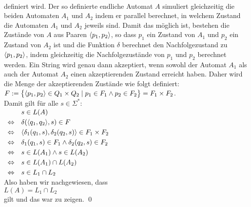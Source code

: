 \\[0.2cm]
definiert wird.  Der so definierte endliche Automat $A$ simuliert gleichzeitig die 
beiden Automaten $A_1$ und $A_2$ indem er parallel berechnet, in
welchem Zustand die Automaten $A_1$ und $A_2$ jeweils sind.  Damit das m\"oglich ist, bestehen die Zust\"ande
von $A$ aus Paaren $\pair(p_1,p_2)$, so dass $p_1$ ein Zustand von $A_1$ und $p_2$ ein
Zustand von $A_2$ ist und die Funktion $\delta$ berechnet den Nachfolgezustand zu
$\pair(p_1,p_2)$, indem gleichzeitig die Nachfolgezust\"ande von $p_1$ und $p_2$ berechnet werden.
Ein String wird genau dann akzeptiert, wenn sowohl der Automat $A_1$ als auch der Automat $A_2$ einen
akzeptierenden Zustand erreicht haben.  Daher wird die Menge der akzeptierenden Zust\"ande 
wie folgt definiert:
\\[0.2cm]
\hspace*{1.3cm}
$F := \bigl\{ \pair(p_1,p_2) \in Q_1 \times Q_2 \mid p_1 \in F_1 \wedge p_2 \in F_2 \bigr\} = F_1 \times F_2$.
\\[0.2cm]
Damit gilt f\"ur alle $s \in \Sigma^*$:
\\[0.2cm]
\hspace*{1.3cm}
$
\begin{array}[t]{cl}
                & s \in L(A)                                                           \\[0.1cm]
\Leftrightarrow & \delta(\pair(q_1,q_2), s) \in F                                      \\[0.1cm]
\Leftrightarrow & \langle \delta_1(q_1,s), \delta_2(q_2, s) \rangle \in F_1 \times F_2 \\[0.1cm]
\Leftrightarrow & \delta_1(q_1,s) \in F_1 \wedge  \delta_2(q_2, s) \in F_2             \\[0.1cm]
\Leftrightarrow & s \in L(A_1) \wedge  s \in L(A_2)                                    \\[0.1cm]
\Leftrightarrow & s \in L(A_1) \cap L(A_2)                                             \\[0.1cm]
\Leftrightarrow & s \in L_1 \cap L_2                                                 
\end{array}
$
\\[0.2cm]
Also haben wir nachgewiesen, dass
\\[0.2cm]
\hspace*{1.3cm}
 $L(A) = L_1 \cap L_2$ 
\\[0.2cm]
gilt und das war zu zeigen. \qed


